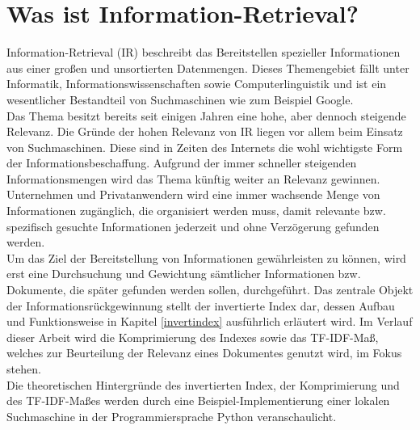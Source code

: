 \section{Was ist Information-Retrieval?}
Information-Retrieval (IR) beschreibt das Bereitstellen spezieller Informationen aus einer großen und unsortierten Datenmengen. Dieses Themengebiet fällt unter Informatik, Informationswissenschaften sowie Computerlinguistik und ist ein wesentlicher Bestandteil von Suchmaschinen wie zum Beispiel Google.
\\
Das Thema besitzt bereits seit einigen Jahren eine hohe, aber dennoch steigende Relevanz. Die Gründe der hohen Relevanz von IR liegen vor allem beim Einsatz von Suchmaschinen. Diese sind in Zeiten des Internets die wohl wichtigste Form der Informationsbeschaffung. Aufgrund der immer schneller steigenden Informationsmengen wird das Thema künftig weiter an Relevanz gewinnen. Unternehmen und Privatanwendern wird eine immer wachsende Menge von Informationen zugänglich, die organisiert werden muss, damit relevante bzw. spezifisch gesuchte Informationen jederzeit und ohne Verzögerung gefunden werden.
\\
Um das Ziel der Bereitstellung von Informationen gewährleisten zu können, wird erst eine Durchsuchung und Gewichtung sämtlicher Informationen bzw. Dokumente, die später gefunden werden sollen, durchgeführt. Das zentrale Objekt der Informationsrückgewinnung stellt der invertierte Index dar, dessen Aufbau und Funktionsweise in Kapitel \ref{invertindex} ausführlich erläutert wird. Im Verlauf dieser Arbeit wird die Komprimierung des Indexes sowie das TF-IDF-Maß, welches zur Beurteilung der Relevanz eines Dokumentes genutzt wird, im Fokus stehen.
\\
Die theoretischen Hintergründe des invertierten Index, der Komprimierung und des TF-IDF-Maßes werden durch eine Beispiel-Implementierung einer lokalen Suchmaschine in der Programmiersprache Python veranschaulicht.

